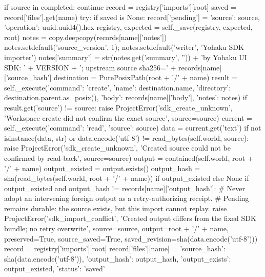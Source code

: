            if source in completed:
                continue
            record = registry['imports'][root]
            saved = record['files'].get(name)
            try:
                if saved is None:
                    record['pending'] = {'source': source, 'operation': uuid.uuid4().hex}
                    registry, expected = self._save(registry, expected, root)
                    notes = copy.deepcopy(records[name]['notes'])
                    notes.setdefault('source_version', 1); notes.setdefault('writer', 'Yohaku SDK importer')
                    notes['summary'] = str(notes.get('summary', '')) + '\nImported by Yohaku UI SDK: ' + VERSION + '; upstream source sha256=' + records[name]['source_hash']
                    destination = PurePosixPath(root + '/' + name)
                    result = self._execute({'command': 'create', 'name': destination.name,
                                            'directory': destination.parent.as_posix(), 'body': records[name]['body'], 'notes': notes})
                    if result.get('source') != source:
                        raise ProjectError('sdk_create_unknown', 'Workspace create did not confirm the exact source', source=source)
                    current = self._execute({'command': 'read', 'source': source})
                    data = current.get('text')
                    if not isinstance(data, str) or data.encode('utf-8') != read_bytes(self.world, source):
                        raise ProjectError('sdk_create_unknown', 'Created source could not be confirmed by read-back', source=source)
                    output = contained(self.world, root + '/' + name)
                    output_existed = output.exists()
                    output_hash = sha(read_bytes(self.world, root + '/' + name)) if output_existed else None
                    if output_existed and output_hash != records[name]['output_hash']:
                        # Never adopt an intervening foreign output as a retry-authorizing receipt.
                        # Pending remains durable: the source exists, but this import cannot replay.
                        raise ProjectError('sdk_import_conflict', 'Created output differs from the fixed SDK bundle; no retry overwrite',
                                           source=source, output=root + '/' + name, preserved=True,
                                           source_saved=True, saved_revision=sha(data.encode('utf-8')))
                    record = registry['imports'][root]
                    record['files'][name] = {'source_hash': sha(data.encode('utf-8')), 'output_hash': output_hash, 'output_exists': output_existed, 'status': 'saved'}
